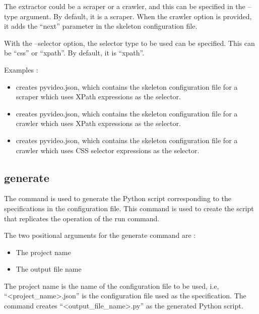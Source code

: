 \documentclass[letterpaper,12pt,english]{sphinxmanual}
\begin{document}
The extractor could be a scraper or a crawler, and this can be specified in the --type argument. By default, it is a scraper. When the crawler option is provided, it adds the ``next'' parameter in the skeleton configuration file.

With the --selector option, the selector type to be used can be specified. This can be ``css'' or ``xpath''. By default, it is ``xpath''.

Examples :
\begin{itemize}
\item {} 
 creates pyvideo.json, which contains the skeleton configuration file for a scraper which uses XPath expressions as the selector.

\item {} 
 creates pyvideo.json, which contains the skeleton configuration file for a crawler which uses XPath expressions as the selector.

\item {} 
 creates pyvideo.json, which contains the skeleton configuration file for a crawler which uses CSS selector expressions as the selector.

\end{itemize}


\subsection{generate}
\label{framework/commands:command-generate}\label{framework/commands:generate}
The  command is used to generate the Python script corresponding to the specifications in the configuration file. This command is used to create the script that replicates the operation of the run command.

The two positional arguments for the generate command are :
\begin{itemize}
\item {} 
The project name

\item {} 
The output file name

\end{itemize}

The project name is the name of the configuration file to be used, i.e, ``\textless{}project\_name\textgreater{}.json'' is the configuration file used as the specification. The command creates ``\textless{}output\_file\_name\textgreater{}.py'' as the generated Python script.
\end{document}
